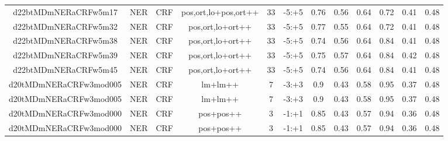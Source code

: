 \documentclass[a4paper]{article}
\begin{document}
\begin{landscape}
\begin{center}
\begin{tabular}{ |c|c|c|c|c|c|c|c|c|c|c|c|}
 	
 
 	
 		
 		\small{ d22btMDmNERaCRFw5m17 } & NER & CRF & pos,ort,lo+pos,ort++  &  33 &  -5:+5  &  0.76 & 0.56 & 0.64  &  0.72 & 0.41 & 0.48 \\
 		

 	
 
 	
 		
 		\small{ d22btMDmNERaCRFw5m32 } & NER & CRF & pos,ort,lo+ort++  &  33 &  -5:+5  &  0.77 & 0.55 & 0.64  &  0.72 & 0.41 & 0.48 \\
 		

 	
 
 	
 		
 		\small{ d22btMDmNERaCRFw5m38 } & NER & CRF & pos,ort,lo+ort++  &  33 &  -5:+5  &  0.74 & 0.56 & 0.64  &  0.84 & 0.41 & 0.48 \\
 		

 	
 
 	
 		
 		\small{ d22btMDmNERaCRFw5m39 } & NER & CRF & pos,ort,lo+ort++  &  33 &  -5:+5  &  0.75 & 0.57 & 0.64  &  0.84 & 0.42 & 0.48 \\
 		

 	
 
 	
 		
 		\small{ d22btMDmNERaCRFw5m45 } & NER & CRF & pos,ort,lo+ort++  &  33 &  -5:+5  &  0.74 & 0.56 & 0.64  &  0.84 & 0.41 & 0.48 \\
 		

 	
 
 	
 		
 		\small{ d20tMDmNERaCRFw3mod005 } & NER & CRF & lm+lm++  &  7 &  -3:+3  &  0.9 & 0.43 & 0.58  &  0.95 & 0.37 & 0.48 \\
 		

 	
 
 	
 		
 		\small{ d20tMDmNERaCRFw3mod005 } & NER & CRF & lm+lm++  &  7 &  -3:+3  &  0.9 & 0.43 & 0.58  &  0.95 & 0.37 & 0.48 \\
 		

 	
 
 	
 		
 		\small{ d20tMDmNERaCRFw3mod000 } & NER & CRF & pos+pos++  &  3 &  -1:+1  &  0.85 & 0.43 & 0.57  &  0.94 & 0.36 & 0.48 \\
 		

 	
 
 	
 		
 		\small{ d20tMDmNERaCRFw3mod000 } & NER & CRF & pos+pos++  &  3 &  -1:+1  &  0.85 & 0.43 & 0.57  &  0.94 & 0.36 & 0.48 \\
 		


\end{tabular}
\end{center}
\end{landscape}
\end{document}
